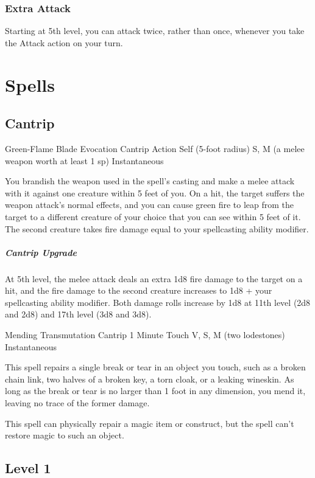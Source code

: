 \documentclass[letterpaper,openany,oneside,twocolumn]{book}
\begin{document}
\subsubsection*{Extra Attack}
Starting at 5th level, you can attack twice, rather than once, whenever you take the Attack action on your turn.

\section*{Spells}
\subsection*{Cantrip}

\DndSpellHeader
  {Green-Flame Blade}
  {Evocation Cantrip}
  {Action}
  {Self (5-foot radius)}
  {S, M (a melee weapon worth at least 1 sp)}
  {Instantaneous}

You brandish the weapon used in the spell's casting and make a melee attack with it against one creature within 5 feet of you. On a hit, the target suffers the weapon attack's normal effects, and you can cause green fire to leap from the target to a different creature of your choice that you can see within 5 feet of it. The second creature takes fire damage equal to your spellcasting ability modifier.

\subparagraph*{Cantrip Upgrade} At 5th level, the melee attack deals an extra 1d8 fire damage to the target on a hit, and the fire damage to the second creature increases to 1d8 + your spellcasting ability modifier. Both damage rolls increase by 1d8 at 11th level (2d8 and 2d8) and 17th level (3d8 and 3d8).

\DndSpellHeader
  {Mending}
  {Transmutation Cantrip}
  {1 Minute}
  {Touch}
  {V, S, M (two lodestones)}
  {Instantaneous}

This spell repairs a single break or tear in an object you touch, such as a broken chain link, two halves of a broken key, a torn cloak, or a leaking wineskin. As long as the break or tear is no larger than 1 foot in any dimension, you mend it, leaving no trace of the former damage.

This spell can physically repair a magic item or construct, but the spell can't restore magic to such an object.

\subsection*{Level 1}
\end{document}
